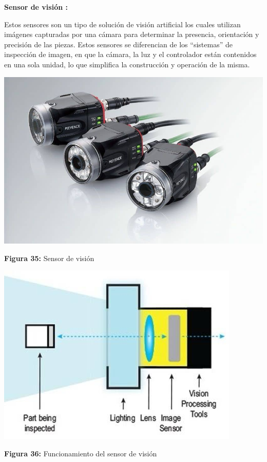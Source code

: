 \vspace{10mm}
\textbf{Sensor de visión : }

Estos sensores son un tipo de solución de visión artificial los cuales utilizan imágenes capturadas por una cámara para determinar la presencia, orientación y  precisión de las piezas. Estos sensores se diferencian de los “sistemas” de inspección de imagen, en que la cámara, la luz y el controlador están contenidos en una sola unidad, lo que simplifica la construcción y operación de la misma.

\vspace{5mm}

\begin{center}
	\includegraphics[width=0.4\linewidth, height=0.2\textwidth]{img/vision}
	
	\vspace{2mm} %
	
	\textbf{Figura 35:} Sensor de visión
\end{center}

\vspace{5mm} %

\begin{center}
	\includegraphics[width=0.5\linewidth]{img/Svision}
	
	\vspace{2mm} %
	
	\textbf{Figura 36:} Funcionamiento del sensor de visión
\end{center}



